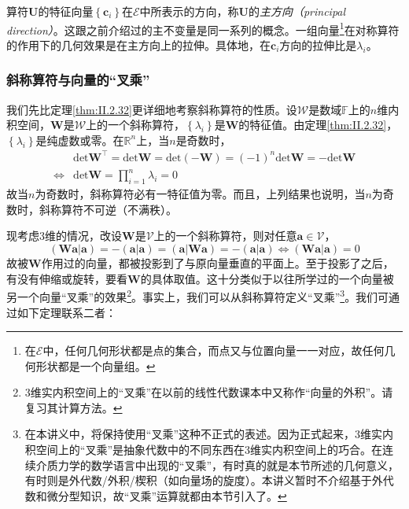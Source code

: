 \documentclass[main.tex]{subfiles}
\begin{document}
算符$\mathbf{U}$的特征向量$\left\{\mathbf{c}_i\right\}$在$\mathcal{E}$中所表示的方向，称$\mathbf{U}$的\emph{主方向（principal direction）}。这跟之前介绍过的主不变量是同一系列的概念。一组向量\footnote{在$\mathcal{E}$中，任何几何形状都是点的集合，而点又与位置向量一一对应，故任何几何形状都是一个向量组。}在对称算符的作用下的几何效果是在主方向上的拉伸。具体地，在$\mathbf{c}_i$方向的拉伸比是$\lambda_i$。

\subsubsection{斜称算符与向量的“叉乘”}
我们先比定理\ref{thm:II.2.32}更详细地考察斜称算符的性质。设$\mathcal{W}$是数域$\mathbb{F}$上的$n$维内积空间，$\mathbf{W}$是$\mathcal{W}$上的一个斜称算符，$\left\{\lambda_i\right\}$是$\mathbf{W}$的特征值。由定理\ref{thm:II.2.32}，$\left\{\lambda_i\right\}$是纯虚数或零。在$\mathbb{R}^n$上，当$n$是奇数时，
\begin{align*}
                    & \mathrm{det}\mathbf{W}^\intercal=\mathrm{det}\mathbf{W}=\mathrm{det}\left(-\mathbf{W}\right)=\left(-1\right)^n\mathrm{det}\mathbf{W}=-\mathrm{det}\mathbf{W} \\
    \Leftrightarrow & \mathrm{det}\mathbf{W}=\prod_{i=1}^n\lambda_i=0
\end{align*}
故当$n$为奇数时，斜称算符必有一特征值为零。而且，上列结果也说明，当$n$为奇数时，斜称算符不可逆（不满秩）。

现考虑3维的情况，改设$\mathbf{W}$是$\mathcal{V}$上的一个斜称算符，则对任意$\mathbf{a}\in\mathcal{V}$，
\[\left(\mathbf{Wa}|\mathbf{a}\right)=-\left(\mathbf{a}|\mathbf{a}\right)=\left(\mathbf{a}|\mathbf{Wa}\right)=-\left(\mathbf{a}|\mathbf{a}\right)\Leftrightarrow\left(\mathbf{Wa}|\mathbf{a}\right)=0\]
故被$\mathbf{W}$作用过的向量，都被投影到了与原向量垂直的平面上。至于投影了之后，有没有伸缩或旋转，要看$\mathbf{W}$的具体取值。这十分类似于以往所学过的一个向量被另一个向量“叉乘”的效果\footnote{3维实内积空间上的“叉乘”在以前的线性代数课本中又称作“向量的外积”\cite[\S3.2]{周胜林2012线性代数}。请复习其计算方法。}。事实上，我们可以从斜称算符定义“叉乘”\footnote{在本讲义中，将保持使用“叉乘”这种不正式的表述。因为正式起来，3维实内积空间上的“叉乘”是抽象代数中的不同东西在3维实内积空间上的巧合。在连续介质力学的数学语言中出现的“叉乘”，有时真的就是本节所述的几何意义，有时则是外代数/外积/楔积（如向量场的旋度）。本讲义暂时不介绍基于外代数和微分型知识，故“叉乘”运算就都由本节引入了。}。我们可通过如下定理联系二者：
\end{document}
